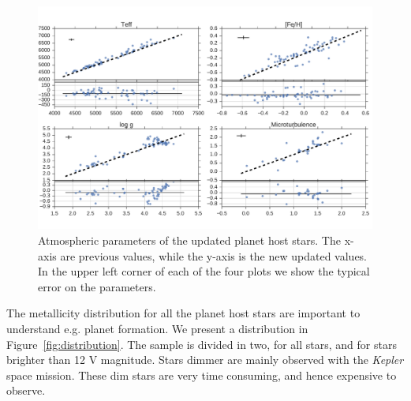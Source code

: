 \documentclass{aa}
\begin{document}
\begin{figure}[tpb]
    \centering
    \includegraphics[width=1.0\linewidth,natwidth=870,natheight=580]{figures/update.pdf}
    \caption{Atmospheric parameters of the updated planet host stars. The x-axis
    are previous values, while the y-axis is the new updated values. In the
    upper left corner of each of the four plots we show the typical error
    on the parameters.}
    \label{fig:update}
\end{figure}

The metallicity distribution for all the planet host stars are important to
understand e.g. planet formation. We present a distribution in
Figure~\ref{fig:distribution}. The sample is divided in two, for all stars, and
for stars brighter than 12 V magnitude. Stars dimmer are mainly observed with
the \emph{Kepler} space mission. These dim stars are very time consuming, and
hence expensive to observe.
\end{document}
